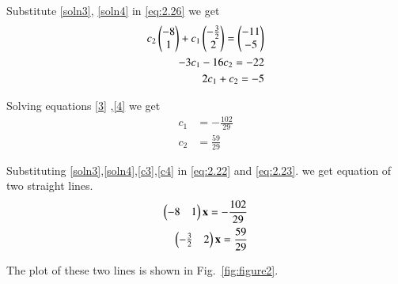 \documentclass[journal,12pt,twocolumn]{IEEEtran}
\begin{document}
Substitute \eqref{soln3}, \eqref{soln4} in \eqref{eq:2.26} we get 
\begin{align}
    c_2\begin{pmatrix}-8\\1\end{pmatrix}+c_1\begin{pmatrix}-\frac{3}{2}\\2\end{pmatrix}=\begin{pmatrix} -11\\ -5\end{pmatrix}\\
    -3c_1-16c_2=-22\label{3}\\
    2c_1+c_2=-5\label{4}
\end{align}

Solving equations \eqref{3} ,\eqref{4} we get 
\begin{align}
    c_1&=-\frac{102}{29}\label{c3}\\
    c_2&=\frac{59}{29}\label{c4}
\end{align}

Substituting \eqref{soln3},\eqref{soln4},\eqref{c3},\eqref{c4} in \eqref{eq:2.22} and \eqref{eq:2.23}. we get equation of two straight lines.
\begin{align}
    \begin{pmatrix}-8 & 1\end{pmatrix}\mathbf{x}=-\frac{102}{29}\\
    \begin{pmatrix}-\frac{3}{2} & 2\end{pmatrix}\mathbf{x}=\frac{59}{29}
\end{align}

The plot of these two lines is shown in Fig.~\ref{fig:figure2}.
\end{document}
